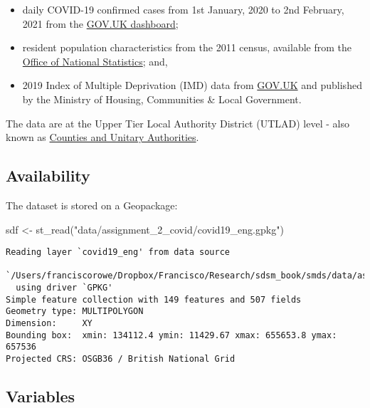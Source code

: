 \documentclass[
  letterpaper,
  krantz2]{style/krantz}
\newenvironment{Shaded}{\begin{snugshade}}{\end{snugshade}}
\newcommand{\FunctionTok}[1]{\textcolor[rgb]{0.28,0.35,0.67}{#1}}
\newcommand{\NormalTok}[1]{\textcolor[rgb]{0.00,0.23,0.31}{#1}}
\newcommand{\OtherTok}[1]{\textcolor[rgb]{0.00,0.23,0.31}{#1}}
\newcommand{\StringTok}[1]{\textcolor[rgb]{0.13,0.47,0.30}{#1}}
\begin{document}
\begin{itemize}
\item
  daily COVID-19 confirmed cases from 1st January, 2020 to 2nd February,
  2021 from the \href{https://coronavirus.data.gov.uk}{GOV.UK
  dashboard};
\item
  resident population characteristics from the 2011 census, available
  from the \href{https://www.nomisweb.co.uk/home/census2001.asp}{Office
  of National Statistics}; and,
\item
  2019 Index of Multiple Deprivation (IMD) data from
  \href{https://www.gov.uk/government/statistics/english-indices-of-deprivation-2019}{GOV.UK}
  and published by the Ministry of Housing, Communities \& Local
  Government.
\end{itemize}

The data are at the Upper Tier Local Authority District (UTLAD) level -
also known as \href{https://geoportal.statistics.gov.uk}{Counties and
Unitary Authorities}.

\hypertarget{availability-1}{%
\subsection*{Availability}\label{availability-1}}

The dataset is stored on a Geopackage:

\begin{Shaded}
\begin{Highlighting}[]
\NormalTok{sdf }\OtherTok{\textless{}{-}} \FunctionTok{st\_read}\NormalTok{(}\StringTok{"data/assignment\_2\_covid/covid19\_eng.gpkg"}\NormalTok{)}
\end{Highlighting}
\end{Shaded}

\begin{verbatim}
Reading layer `covid19_eng' from data source 
  `/Users/franciscorowe/Dropbox/Francisco/Research/sdsm_book/smds/data/assignment_2_covid/covid19_eng.gpkg' 
  using driver `GPKG'
Simple feature collection with 149 features and 507 fields
Geometry type: MULTIPOLYGON
Dimension:     XY
Bounding box:  xmin: 134112.4 ymin: 11429.67 xmax: 655653.8 ymax: 657536
Projected CRS: OSGB36 / British National Grid
\end{verbatim}

\hypertarget{variables-1}{%
\subsection*{Variables}\label{variables-1}}
\end{document}
